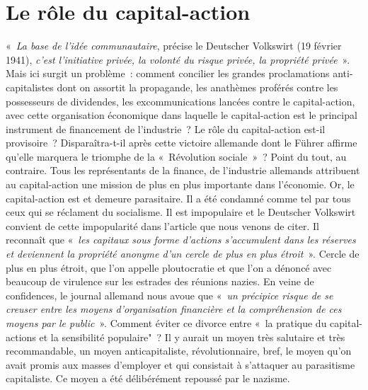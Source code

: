 \documentclass[french,twoside]{book} %
\begin{document}
\section[{Le rôle du capital-action}]{Le rôle du capital-action}
\noindent « \emph{La base de l’idée communautaire}, précise le Deutscher Volkswirt (19 février 1941), \emph{c’est l’initiative privée, la volonté du risque privée, la propriété privée} ». Mais ici surgit un problème : comment concilier les grandes proclamations anti-capitalistes dont on assortit la propagande, les anathèmes proférés contre les possesseurs de dividendes, les excommunications lancées contre le capital-action, avec cette organisation économique dans laquelle le capital-action est le principal instrument de financement de l’industrie ? Le rôle du capital-action est-il provisoire ? Disparaîtra-t-il après cette victoire allemande dont le Führer affirme qu’elle marquera le triomphe de la « Révolution sociale » ? Point du tout, au contraire. Tous les représentants de la finance, de l’industrie allemands attribuent au capital-action une mission de plus en plus importante dans l’économie. Or, le capital-action est et demeure parasitaire. Il a été condamné comme tel par tous ceux qui se réclament du socialisme. Il est impopulaire et le Deutscher Volkswirt convient de cette impopularité dans l’article que nous venons de citer. Il reconnaît que « \emph{les capitaux sous forme d’actions s’accumulent dans les réserves et deviennent la propriété anonyme d’un cercle de plus en plus étroit} ». Cercle de plus en plus étroit, que l’on appelle ploutocratie et que l’on a dénoncé avec beaucoup de virulence sur les estrades des réunions nazies. En veine de confidences, le journal allemand nous avoue que « \emph{un précipice risque de se creuser entre les moyens d’organisation financière et la compréhension de ces moyens par le public} ». Comment éviter ce divorce entre « la pratique du capital-actions et la sensibilité populaire" ? Il y aurait un moyen très salutaire et très recommandable, un moyen anticapitaliste, révolutionnaire, bref, le moyen qu’on avait promis aux masses d’employer et qui consistait à s’attaquer au parasitisme capitaliste. Ce moyen a été délibérément repoussé par le nazisme.
\end{document}
